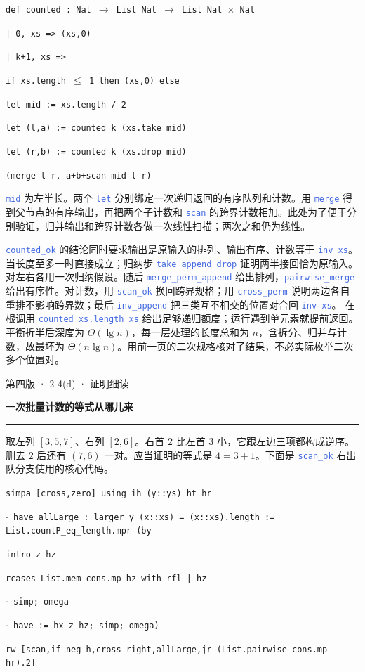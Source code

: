 \documentclass[UTF8,11pt,a4paper,fontset=fandol]{ctexart}
\newcommand{\HandoutLesson}[2]{%
  \par{\small\heiti\color{BrickRed}#1}\par\vspace{3pt}
  {\fontsize{21}{27}\selectfont\heiti\bfseries #2}\par
  \textcolor{BrickRed}{\rule{\linewidth}{.7pt}}\par}
\newcommand{\src}[1]{\textcolor{RoyalBlue}{\texttt{#1}}}
\newcommand{\subhead}[1]{\par\vspace{3pt}{\heiti\bfseries\color{RoyalBlue}#1}\par}
\newenvironment{leanblock}{\par\smallskip\noindent\begin{lrbox}{\leanbox}\begin{minipage}{\dimexpr\linewidth-12pt\relax}\raggedright\small\setlength{\parskip}{0pt}}{\end{minipage}\end{lrbox}\colorbox{RoyalBlue!6}{\usebox{\leanbox}}\par\smallskip}
\newcommand{\lineofcode}[2]{\noindent\hspace*{#1em}\strut\texttt{#2}\par}
\begin{document}
\begin{leanblock}
\lineofcode{0.0}{def counted : Nat \ensuremath{\to} List Nat \ensuremath{\to} List Nat \ensuremath{\times} Nat}
\lineofcode{0.9}{| 0, xs => (xs,0)}
\lineofcode{0.9}{| k+1, xs =>}
\lineofcode{1.8}{if xs.length \ensuremath{\leq} 1 then (xs,0) else}
\lineofcode{1.8}{let mid := xs.length / 2}
\lineofcode{1.8}{let (l,a) := counted k (xs.take mid)}
\lineofcode{1.8}{let (r,b) := counted k (xs.drop mid)}
\lineofcode{1.8}{(merge l r, a+b+scan mid l r)}
\end{leanblock}
\src{mid} 为左半长。两个 \src{let} 分别绑定一次递归返回的有序队列和计数。用 \src{merge} 得到父节点的有序输出，再把两个子计数和 \src{scan} 的跨界计数相加。此处为了便于分别验证，归并输出和跨界计数各做一次线性扫描；两次之和仍为线性。
\subhead{把代码的三个返回性质对齐}
\src{counted\_ok} 的结论同时要求输出是原输入的排列、输出有序、计数等于 \src{inv xs}。当长度至多一时直接成立；归纳步 \src{take\_append\_drop} 证明两半接回恰为原输入。对左右各用一次归纳假设。随后 \src{merge\_perm\_append} 给出排列，\src{pairwise\_merge} 给出有序性。对计数，用 \src{scan\_ok} 换回跨界规格；用 \src{cross\_perm} 说明两边各自重排不影响跨界数；最后 \src{inv\_append} 把三类互不相交的位置对合回 \src{inv xs}。
在根调用 \src{counted xs.length xs} 给出足够递归额度；运行遇到单元素就提前返回。平衡折半后深度为 $\Theta(\lg n)$，每一层处理的长度总和为 $n$，含拆分、归并与计数，故最坏为 $\Theta(n\lg n)$。用前一页的二次规格核对了结果，不必实际枚举二次多个位置对。
\par{}
\clearpage{}\label{p51}\HandoutLesson{第四版 · 2-4(d) · 证明细读}{一次批量计数的等式从哪儿来}
取左列 $[3,5,7]$、右列 $[2,6]$。右首 $2$ 比左首 $3$ 小，它跟左边三项都构成逆序。删去 $2$ 后还有 $(7,6)$ 一对。应当证明的等式是 $4=3+1$。下面是 \src{scan\_ok} 右出队分支使用的核心代码。
\begin{leanblock}
\lineofcode{3.6}{simpa [cross,zero] using ih (y::ys) ht hr}
\lineofcode{2.7}{\ensuremath{\cdot} have allLarge : larger y (x::xs) = (x::xs).length := List.countP\_eq\_length.mpr (by}
\lineofcode{4.5}{intro z hz}
\lineofcode{4.5}{rcases List.mem\_cons.mp hz with rfl | hz}
\lineofcode{4.5}{\ensuremath{\cdot} simp; omega}
\lineofcode{4.5}{\ensuremath{\cdot} have := hx z hz; simp; omega)}
\lineofcode{3.6}{rw [scan,if\_neg h,cross\_right,allLarge,jr (List.pairwise\_cons.mp hr).2]}
\end{leanblock}
\end{document}
